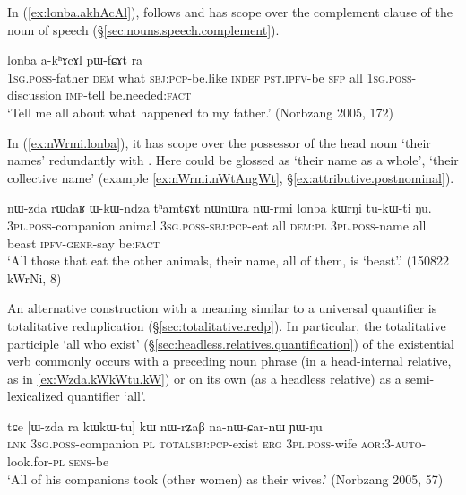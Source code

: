 In (\ref{ex:lonba.akhAcAl}),  follows and has scope over the complement clause of the noun of speech  (§\ref{sec:nouns.speech.complement}).

\begin{exe}
\ex \label{ex:lonba.akhAcAl}
  lonba a-kʰɤcɤl pɯ-fɕɤt ra \\
 \textsc{1sg}.\textsc{poss}-father \textsc{dem} what \textsc{sbj}:\textsc{pcp}-be.like \textsc{indef} \textsc{pst}.\textsc{ipfv}-be \textsc{sfp} all \textsc{1sg}.\textsc{poss}-discussion \textsc{imp}-tell be.needed:\textsc{fact} \\
\glt `Tell me all about what happened to my father.' (Norbzang 2005, 172)
\end{exe}

In (\ref{ex:nWrmi.lonba}), it has scope over the possessor of the head noun  `their names' redundantly with . Here  could be glossed as  `their name as a whole', `their collective name' (example \ref{ex:nWrmi.nWtAngWt}, §\ref{ex:attributive.postnominal}).

\begin{exe}
\ex \label{ex:nWrmi.lonba}
\gll nɯ-zda rɯdaʁ ɯ-kɯ-ndza tʰamtɕɤt nɯnɯra nɯ-rmi lonba kɯrŋi tu-kɯ-ti ŋu. \\
\textsc{3pl}.\textsc{poss}-companion animal \textsc{3sg}.\textsc{poss}-\textsc{sbj}:\textsc{pcp}-eat all \textsc{dem}:\textsc{pl} \textsc{3pl}.\textsc{poss}-name all beast \textsc{ipfv}-\textsc{genr}-say be:\textsc{fact} \\ 
 \glt `All those that eat the other animals, their name, all of them, is `beast'.'  (150822 kWrNi, 8)
\end{exe}
 
An alternative construction with a meaning similar to a universal quantifier is totalitative reduplication (§\ref{sec:totalitative.redp}). In particular, the totalitative participle  `all who exist' (§\ref{sec:headless.relatives.quantification}) of the existential verb  commonly occurs with a preceding noun phrase (in a head-internal relative, as in \ref{ex:Wzda.kWkWtu.kW}) or on its own (as a headless relative) as a semi-lexicalized quantifier `all'. 

\begin{exe}
\ex \label{ex:Wzda.kWkWtu.kW}
\gll tɕe [ɯ-zda ra kɯ\redp{}kɯ-tu] kɯ nɯ-rʑaβ na-nɯ-ɕar-nɯ ɲɯ-ŋu \\
\textsc{lnk} \textsc{3sg}.\textsc{poss}-companion \textsc{pl} \textsc{total}\redp{}\textsc{sbj}:\textsc{pcp}-exist \textsc{erg} \textsc{3pl}.\textsc{poss}-wife \textsc{aor}:3\flobv{}-\textsc{auto}-look.for-\textsc{pl} \textsc{sens}-be \\
\glt `All of his companions took (other women) as their wives.' (Norbzang 2005, 57)
\end{exe}
  
